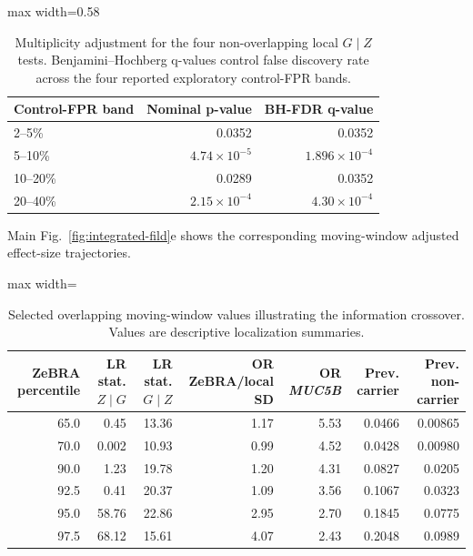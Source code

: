 \begin{table}[!t]
\caption{Multiplicity adjustment for the four non-overlapping local $G\mid Z$ tests. Benjamini--Hochberg q-values control false discovery rate across the four reported exploratory control-FPR bands.}
\label{tab:supp-local-fdr}
\centering\small
\setlength{\tabcolsep}{6pt}
\renewcommand{\arraystretch}{1.04}
\begin{adjustbox}{max width=0.58\textwidth}
\begin{tabular}{lrr}
\toprule
Control-FPR band & Nominal p-value & BH-FDR q-value\\
\midrule
2--5\% & 0.0352 & 0.0352\\
5--10\% & $4.74\times10^{-5}$ & $1.896\times10^{-4}$\\
10--20\% & 0.0289 & 0.0352\\
20--40\% & $2.15\times10^{-4}$ & $4.30\times10^{-4}$\\
\bottomrule
\end{tabular}
\end{adjustbox}
\end{table}

Main Fig.~\ref{fig:integrated-fild}e shows the corresponding moving-window adjusted effect-size trajectories.

\begin{table}[!t]
\caption{Selected overlapping moving-window values illustrating the information crossover. Values are descriptive localization summaries.}
\label{tab:supp-local-windows}
\centering\scriptsize
\setlength{\tabcolsep}{3.5pt}
\renewcommand{\arraystretch}{1.03}
\begin{adjustbox}{max width=\textwidth}
\begin{tabular}{rrrrrrr}
\toprule
ZeBRA percentile & LR stat. $Z\mid G$ & LR stat. $G\mid Z$ & OR ZeBRA/local SD & OR \textit{MUC5B} & Prev. carrier & Prev. non-carrier\\
\midrule
65.0 & 0.45 & 13.36 & 1.17 & 5.53 & 0.0466 & 0.00865\\
70.0 & 0.002 & 10.93 & 0.99 & 4.52 & 0.0428 & 0.00980\\
90.0 & 1.23 & 19.78 & 1.20 & 4.31 & 0.0827 & 0.0205\\
92.5 & 0.41 & 20.37 & 1.09 & 3.56 & 0.1067 & 0.0323\\
95.0 & 58.76 & 22.86 & 2.95 & 2.70 & 0.1845 & 0.0775\\
97.5 & 68.12 & 15.61 & 4.07 & 2.43 & 0.2048 & 0.0989\\
\bottomrule
\end{tabular}
\end{adjustbox}
\end{table}

